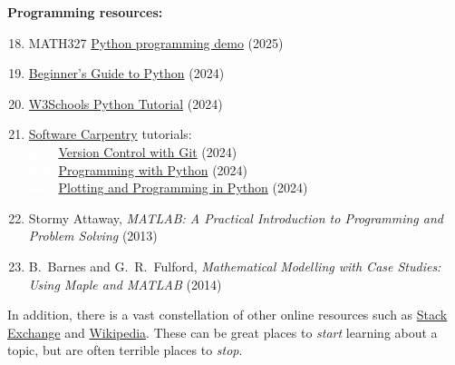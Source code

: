 \noindent\textbf{Programming resources:} \\[-24 pt]
\begin{enumerate}
  \setcounter{enumi}{17}
  \item MATH327 \href{https://tinyurl.com/math327demo}{Python programming demo} (2025)
  \item \href{https://wiki.python.org/moin/BeginnersGuide}{Beginner's Guide to Python} (2024)
  \item \href{https://www.w3schools.com/python/default.asp}{W3Schools Python Tutorial} (2024)
  \item \href{https://software-carpentry.org}{Software Carpentry} tutorials: \\
        \textcolor{white}{hack} \href{https://swcarpentry.github.io/git-novice/}{Version Control with Git} (2024) \\
        \textcolor{white}{hack} \href{https://swcarpentry.github.io/python-novice-inflammation/}{Programming with Python} (2024) \\
        \textcolor{white}{hack} \href{https://swcarpentry.github.io/python-novice-gapminder/}{Plotting and Programming in Python} (2024)
  \item Stormy Attaway, \textit{MATLAB: A Practical Introduction to Programming and Problem Solving} (2013)
  \item B.~Barnes and G.~R.~Fulford, \textit{Mathematical Modelling with Case Studies: Using Maple and MATLAB} (2014)
\end{enumerate}

In addition, there is a vast constellation of other online resources such as \href{https://physics.stackexchange.com/questions/tagged/statistical-mechanics}{Stack Exchange} and \href{https://en.wikipedia.org/wiki/Statistical_physics}{Wikipedia}.
These can be great places to \emph{start} learning about a topic, but are often terrible places to \emph{stop}.
